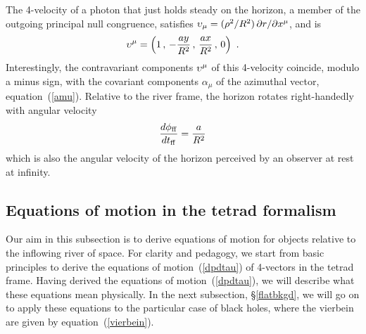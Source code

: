 \documentclass[twocolumn,showpacs,preprintnumbers,amsmath,amssymb,prb]{revtex4}
\begin{document}
The 4-velocity of a photon that just holds steady on the horizon,
a member of the outgoing principal null congruence,
satisfies
$\upsilon_\mu = (\rho^2 / R^2) \, \partial r / \partial x^\mu$,
and is
\begin{equation}
\label{uhor}
  \upsilon^\mu =
  \left( 1 \, , \, - {a y \over R^2} \, , \, {a x \over R^2} \, , \, 0 \right)
  \ .
\end{equation}
Interestingly,
the contravariant components $\upsilon^\mu$ of this 4-velocity
coincide, modulo a minus sign,
with the covariant components $\alpha_\mu$ of the azimuthal vector,
equation~(\ref{amu}).
Relative to the river frame,
the horizon rotates right-handedly with angular velocity
\begin{equation}
  {d\phi_{\rm ff}\over dt_{\rm ff}} = {a \over R^2}
\end{equation}
which is also the angular velocity of the horizon
perceived by an observer at rest at infinity.

\subsection{Equations of motion in the tetrad formalism}
\label{eqmottetrad}

Our aim in this subsection
is to derive equations of motion for objects
relative to the inflowing river of space.
For clarity and pedagogy,
we start from basic principles
to derive the equations of motion~(\ref{dpdtau})
of 4-vectors in the tetrad frame.
Having derived the equations of motion~(\ref{dpdtau}),
we will describe what these equations mean physically.
In the next subsection, \S\ref{flatbkgd},
we will go on to apply these equations to the particular case of black holes,
where the vierbein are given by equation~(\ref{vierbein}).
\end{document}
